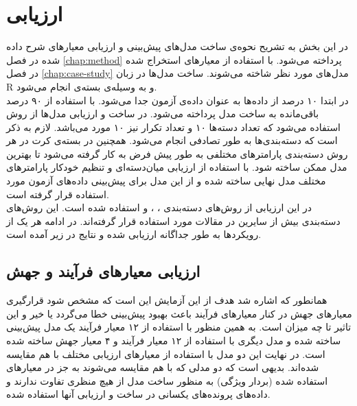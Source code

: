 \chapter{ارزیابی}
\label{chap:evaluation}
در این بخش به تشریح نحوه‌ی ساخت مدل‌های پیش‌بینی و ارزیابی معیارهای شرح داده شده در فصل \ref{chap:method} پرداخته می‌شود. با استفاده از معیارهای استخراج شده در فصل \ref{chap:case-study} مدل‌های مورد نظر شاخته می‌شوند. ساخت مدل‌ها در زبان R و به وسیله‌ی بسته‌ی  \cite{kuhn2008caret} انجام می‌شود.\\
در ابتدا ۱۰ درصد از داده‌ها به عنوان داده‌ی آزمون جدا می‌شود. با استفاده از ۹۰ درصد باقی‌مانده به ساخت مدل پرداخته می‌شود. در ساخت و ارزیابی مدل‌ها از روش  استفاده می‌شود که تعداد دسته‌ها ۱۰ و تعداد تکرار نیز ۱۰ مورد می‌باشد. لازم به ذکر است که دسته‌بندی‌ها به طور تصادفی انجام می‌شود.  همچنین در بسته‌ی کرت در هر روش دسته‌بندی پارامترهای مختلفی به طور پیش فرض به کار گرفته می‌شود تا بهترین مدل ممکن ساخته شود.  با استفاده از ارزیابی میان‌دسته‌ای و تنظیم خودکار پارامترهای مختلف مدل نهایی ساخته شده و از این مدل برای پیش‌بینی داده‌های آزمون مورد استفاده قرار گرفته است.  \\
در این ارزیابی از  روش‌های دسته‌بندی ، ،  و  استفاده شده است. این روش‌های دسته‌بندی بیش از سایرین در مقالات مورد استفاده قرار گرفته‌اند. در ادامه هر یک از رویکردها به طور جداگانه ارزیابی شده و نتایج در زیر آمده است. 


\section{ارزیابی معیارهای فرآیند و جهش}
همانطور که اشاره شد هدف از این آزمایش این است که مشخص شود قرارگیری معیارهای جهش در کنار معیارهای فرآیند باعث بهبود پیش‌بینی خطا می‌گردد یا خیر و این تاثیر تا چه میزان است. به همین منظور  با استفاده از ۱۲ معیار فرآیند یک مدل پیش‌بینی ساخته شده و مدل دیگری  با استفاده از ۱۲ معیار فرآیند و ۴ معیار جهش ساخته شده است. در نهایت این دو مدل با استفاده از معیارهای ارزیابی مختلف با هم مقایسه شده‌اند. بدیهی است که دو مدلی که با هم مقایسه می‌شوند به جز در معیارهای استفاده شده (بردار ویژگی) به منظور ساخت مدل از هیچ منظری تفاوت ندارند و داده‌های  پرونده‌های یکسانی در ساخت و ارزیابی آنها استفاده شده. \\

